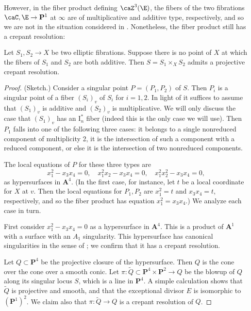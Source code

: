\documentclass{article}
\def\P{\mathbf{P}}
\newcommand{\I}{\mathrm{I}}
\begin{document}
However, in the fiber product defining $\caZ^3(\E)$, the fibers of the two fibrations $\caC,\E\to\P^1$ at $\infty$ are of multiplicative and additive type, respectively, and so we are not in the situation considered in \cite{Schoen}.  Nonetheless, the fiber product still has a crepant resolution:

\begin{prop}  Let $S_1,S_2\to X$ be two elliptic fibrations.  Suppose there is no point of $X$ at which the fibers of $S_1$ and $S_2$ are both additive.  Then $S=S_1\times_X S_2$ admits a projective crepant resolution.
\end{prop} 

\begin{proof} (Sketch.) Consider a singular point $P=(P_1,P_2)$ of $S$.  Then $P_i$ is a singular point of a fiber $(S_i)_v$ of $S_i$ for $i=1,2$.  In light of \cite{Schoen} it suffices to assume that $(S_1)_v$ is additive and $(S_2)_v$ is multiplicative.  We will only discuss the case that $(S_1)_v$ has an $\I_n^*$ fiber (indeed this is the only case we will use).  Then $P_1$ falls into one of the following three cases: it belongs to a single nonreduced component of multiplicity 2, it is the intersection of such a component with a reduced component, or else it is the intersection of two nonreduced components.  

The local equations of $P$ for these three types are 
$$x_1^2 - x_3 x_4 = 0, \quad x_1^2 x_2 - x_3 x_4 = 0, \quad
x_1^2 x_2^2 - x_3 x_4 = 0,$$
as hypersurfaces in $\mathbf{A}^4$.  
(In the first case, for instance, let $t$ be a local coordinate for $X$ at $v$.  Then the local equations for $P_1,P_2$ are $x_1^2=t$ and $x_3x_4=t$, respectively, and so the fiber product has equation $x_1^2=x_3x_4$.)  We analyze each case in turn. 


First consider $x_1^2 - x_3 x_4 = 0$ as a hypersurface in $\mathbf{A}^4$.  This is a product of $\mathbf{A}^1$ with a surface with an $A_1$ singularity.  This hypersurface has canonical singularities in the sense of \cite{Reid};  we confirm that it has a crepant resolution. 

Let $Q\subset\P^4$ be the projective closure of the hypersurface.  Then $Q$ is the cone over the cone over a smooth conic.  Let $\pi: \tilde{Q}\subset \P^4\times\P^2 \to Q$ be the blowup of $Q$ along its singular locus $S$, which is a line in $\P^4$.  A simple calculation shows that $\tilde{Q}$ is projective and smooth, and that the exceptional divisor $E$ is isomorphic to $(\P^1)^2$. We claim also that $\pi: \tilde{Q} \to Q$ is a crepant resolution of $Q$.


\end{proof}
\end{document}
